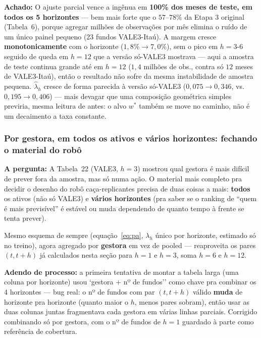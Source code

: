 \documentclass[11pt,a4paper]{article}
\newcommand{\pergunta}[1]{\par\vspace{4pt}\noindent\textbf{\color{azul}A pergunta:} #1\par\vspace{2pt}}
\newcommand{\aha}[1]{\par\vspace{4pt}\noindent\textbf{\color{vermelho}Achado:} #1\par\vspace{2pt}}
\begin{document}
\aha{O ajuste parcial vence a ingênua em \textbf{100\% dos meses de teste, em todos os 5
horizontes} --- bem mais forte que o $57$--$78\%$ da Etapa 3 original (Tabela~6), porque agregar
milhões de observações por mês elimina o ruído de um único painel pequeno (23 fundos VALE3-Itaú).
A margem cresce \textbf{monotonicamente} com o horizonte ($1{,}8\%\to7{,}0\%$), sem o pico em
$h=3$-$6$ seguido de queda em $h=12$ que a versão só-VALE3 mostrava --- aqui a amostra de teste
continua grande até em $h=12$ ($1{,}4$ milhões de obs., contra só $12$ meses de VALE3-Itaú), então
o resultado não sofre da mesma instabilidade de amostra pequena. $\widehat\lambda_h$ cresce de
forma parecida à versão só-VALE3 ($0{,}075\to0{,}346$, vs.\ $0{,}195\to0{,}406$) --- mais devagar
que uma composição geométrica simples previria, mesma leitura de antes: o alvo $w^*$ também se
move no caminho, não é um decaimento a taxa constante.}

\subsubsection*{Por gestora, em todos os ativos e vários horizontes: fechando o material do robô}

\pergunta{A Tabela~22 (VALE3, $h=3$) mostrou qual gestora é mais difícil de prever fora da
amostra, mas só numa ação. O material mais completo pra decidir o desenho do robô
caça-replicantes precisa de duas coisas a mais: \textbf{todos} os ativos (não só VALE3) e
\textbf{vários horizontes} (pra saber se o ranking de ``quem é mais previsível'' é estável ou
muda dependendo de quanto tempo à frente se tenta prever).}

Mesmo esquema de sempre (equação~\eqref{eq:pa}, $\lambda_h$ único por horizonte, estimado só no
treino), agora agregado por \textbf{gestora} em vez de pooled --- reaproveita os pares $(t,t+h)$
já calculados nesta seção para $h=1$ e $h=3$, soma $h=6$ e $h=12$.

\textbf{Adendo de processo:} a primeira tentativa de montar a tabela larga (uma coluna por
horizonte) usou `gestora + nº de fundos'' como chave pra combinar os 4 horizontes --- bug real: o
nº de fundos com par $(t,t+h)$ válido \textbf{muda} de horizonte pra horizonte (quanto maior o
$h$, menos pares sobram), então usar as duas colunas juntas fragmentava cada gestora em várias
linhas parciais. Corrigido combinando só por gestora, com o nº de fundos de $h=1$ guardado à
parte como referência de cobertura.
\end{document}
